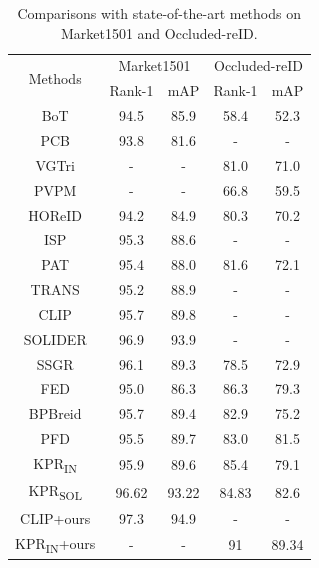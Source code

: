 \begin{table}
\centering
\renewcommand\tabcolsep{5pt}

\begin{tabular}{c|cc|cc}
\hline
 \multirow{2}{*}{Methods}& \multicolumn{2}{c|}{Market1501} & \multicolumn{2}{c}{Occluded-reID} \\ \cline{2-5}
 & Rank-1 & mAP & Rank-1  & mAP \\
\hline
BoT\cite{luo2019bag} & 94.5 & 85.9 & 58.4 & 52.3 \\
PCB\cite{sun2018beyond}& 93.8 & 81.6& - & - \\
VGTri\cite{yang2021learning} & - & - & 81.0 & 71.0 \\
PVPM\cite{gao2020pose} & - & - & 66.8 & 59.5 \\
HOReID\cite{wang2020high} & 94.2 & 84.9 & 80.3 & 70.2 \\
ISP\cite{zhu2020identity} & 95.3 & 88.6 & - & -\\
PAT\cite{li2021diverse} & 95.4 & 88.0 & 81.6 & 72.1 \\
TRANS\cite{he2021transreid} & 95.2 & 88.9 & - & - \\
CLIP\cite{li2023clip} & 95.7 & 89.8 & - & - \\
SOLIDER\cite{chen2023beyond} & 96.9 & 93.9 & - & - \\
SSGR\cite{yan2021occluded} & 96.1 & 89.3 & 78.5 & 72.9 \\
FED\cite{wang2022feature} & 95.0 & 86.3& 86.3 & 79.3 \\
BPBreid\cite{somers2023body} & 95.7 & 89.4 & 82.9 & 75.2\\
PFD\cite{wang2022pose} & 95.5 & 89.7 & 83.0 & 81.5 \\
KPR\textsubscript{IN}\cite{somers2025keypoint} & 95.9 & 89.6 & 85.4 & 79.1 \\
KPR\textsubscript{SOL}\cite{somers2025keypoint} & 96.62 &93.22 &84.83& 82.6\\
\hline
\rowcolor{gray!20}
CLIP+ours & 97.3 & 94.9 & - & -\\
\rowcolor{gray!20}
KPR\textsubscript{IN}+ours & - & - & 91 & 89.34 \\
\hline
\end{tabular}
\caption{Comparisons with state-of-the-art methods on Market1501 and Occluded-reID.}
\label{tab:sota_m}
\end{table}

